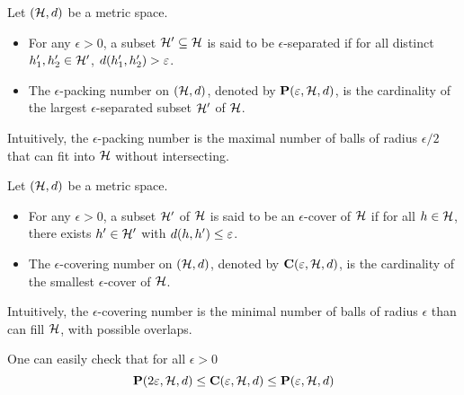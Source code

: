 \begin{tcolorbox}
    \begin{definition}
        Let $(\mathcal{H}, d)$ be a metric space. 
        \begin{itemize}
            \item For any $\epsilon> 0$, a subset $\mathcal{H}' \subseteq \mathcal{H}$ is said to be $\epsilon$-separated if for all distinct $h'_1, h'_2 \in \mathcal{H}'$, $d(h'_1, h'_2) > \varepsilon$.
            \item The $\epsilon$-packing number on $(\mathcal{H}, d)$, denoted by $\mathbf{P}(\varepsilon, \mathcal{H}, d)$, is the cardinality of the largest $\epsilon$-separated subset $\mathcal{H}'$ of $\mathcal{H}$.
        \end{itemize}
        Intuitively, the $\epsilon$-packing number is the maximal number of balls of radius $\epsilon/2$ that can fit into $\mathcal{H}$ without intersecting.
    \end{definition}
\end{tcolorbox}

\begin{tcolorbox}
	\begin{definition}
		Let $(\mathcal{H}, d)$ be a metric space. 
        \begin{itemize}
            \item For any $\epsilon> 0$, a subset $\mathcal{H}'$ of $\mathcal{H}$ is said to be an $\epsilon$-cover of $\mathcal{H}$ if for all $h \in \mathcal{H}$, there exists $h' \in \mathcal{H}'$ with $d(h, h') \leq \varepsilon$.
            \item The $\epsilon$-covering number on $(\mathcal{H}, d)$, denoted by $\mathbf{C}(\varepsilon, \mathcal{H}, d)$, is the cardinality of the smallest $\epsilon$-cover of $\mathcal{H}$.
        \end{itemize}
        Intuitively, the $\epsilon$-covering number is the minimal number of balls of radius $\epsilon$ than can fill $\mathcal{H}$, with possible overlaps.
	\end{definition}
\end{tcolorbox}

    One can easily check that for all $\epsilon>0$
    \begin{equation}
		\label{eqn__pack_cover_pack}
        \mathbf{P}(2\varepsilon, \mathcal{H}, d) \leq \mathbf{C}(\varepsilon, \mathcal{H}, d) \leq \mathbf{P}(\varepsilon, \mathcal{H}, d)
    \end{equation}



